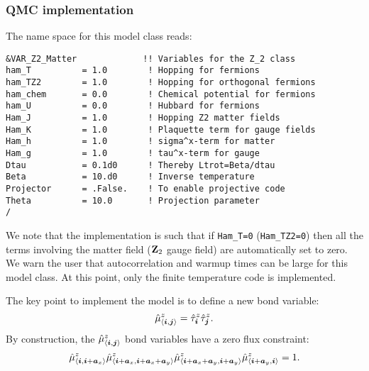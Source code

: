 \subsubsection*{QMC implementation} 

The name space for this model class reads: 

\begin{lstlisting}[style=fortran,escapechar=\#,breaklines=true]
&VAR_Z2_Matter             !! Variables for the Z_2 class
ham_T          = 1.0        ! Hopping for fermions
ham_TZ2        = 1.0        ! Hopping for orthogonal fermions
ham_chem       = 0.0        ! Chemical potential for fermions
ham_U          = 0.0        ! Hubbard for fermions
Ham_J          = 1.0        ! Hopping Z2 matter fields
Ham_K          = 1.0        ! Plaquette term for gauge fields
Ham_h          = 1.0        ! sigma^x-term for matter
Ham_g          = 1.0        ! tau^x-term for gauge
Dtau           = 0.1d0      ! Thereby Ltrot=Beta/dtau
Beta           = 10.d0      ! Inverse temperature
Projector      = .False.    ! To enable projective code
Theta          = 10.0       ! Projection parameter 
/
\end{lstlisting}


We note that the implementation is such that  if \texttt{Ham\_T=0}   (\texttt{Ham\_TZ2=0}) then all the terms involving the matter field ($\mathbf{Z}_{2}$  gauge field) are automatically set to zero.  
We warn the user that autocorrelation and warmup times can be  large for this model class.
At this point, only the finite temperature code is implemented. 

The key point to implement the model is to  define a new bond variable: 
\begin{equation}
	\hat{\mu}^{z}_{ \langle  \boldsymbol{i}, \boldsymbol{j}  \rangle }  =  \hat{\tau}^{z}_{ \boldsymbol{i}}\hat{\tau}^{z}_{\boldsymbol{j}  }. 
\end{equation}  
By construction, the $\hat{\mu}^{z}_{ \langle  \boldsymbol{i}, \boldsymbol{j}  \rangle } $ bond variables   have a zero flux constraint:
\begin{equation}
	\hat{\mu}^{z}_{ \langle  \boldsymbol{i}, \boldsymbol{i} + \boldsymbol{a}_x  \rangle }  \hat{ \mu}^{z}_{ \langle  \boldsymbol{i} + \boldsymbol{a}_x, \boldsymbol{i} + \boldsymbol{a}_x  + \boldsymbol{a}_y \rangle } 
	\hat{\mu}^{z}_{ \langle  \boldsymbol{i} + \boldsymbol{a}_x + \boldsymbol{a}_y, \boldsymbol{i} +  \boldsymbol{a}_y \rangle } \hat{\mu}^{z}_{ \langle  \boldsymbol{i} + \boldsymbol{a}_y, \boldsymbol{i}  \rangle }  = 1. 
\label{zero_flux.eq}
\end{equation} 


